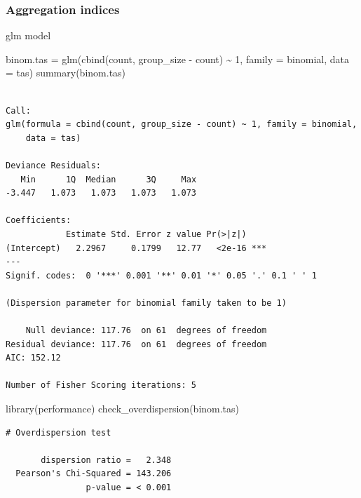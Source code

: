 \documentclass[
  letterpaper,
  DIV=11,
  numbers=noendperiod]{scrreprt}
\newenvironment{Shaded}{\begin{snugshade}}{\end{snugshade}}
\newcommand{\AttributeTok}[1]{\textcolor[rgb]{0.40,0.45,0.13}{#1}}
\newcommand{\DecValTok}[1]{\textcolor[rgb]{0.68,0.00,0.00}{#1}}
\newcommand{\FunctionTok}[1]{\textcolor[rgb]{0.28,0.35,0.67}{#1}}
\newcommand{\NormalTok}[1]{\textcolor[rgb]{0.00,0.23,0.31}{#1}}
\newcommand{\OtherTok}[1]{\textcolor[rgb]{0.00,0.23,0.31}{#1}}
\newcommand{\SpecialCharTok}[1]{\textcolor[rgb]{0.37,0.37,0.37}{#1}}
\begin{document}
\hypertarget{aggregation-indices-1}{%
\subsubsection{Aggregation indices}\label{aggregation-indices-1}}

glm model

\begin{Shaded}
\begin{Highlighting}[]
\NormalTok{binom.tas }\OtherTok{=} \FunctionTok{glm}\NormalTok{(}\FunctionTok{cbind}\NormalTok{(count, group\_size }\SpecialCharTok{{-}}\NormalTok{ count) }\SpecialCharTok{\textasciitilde{}} \DecValTok{1}\NormalTok{,}
                \AttributeTok{family =}\NormalTok{ binomial,}
                \AttributeTok{data =}\NormalTok{ tas)}
\FunctionTok{summary}\NormalTok{(binom.tas)}
\end{Highlighting}
\end{Shaded}

\begin{verbatim}

Call:
glm(formula = cbind(count, group_size - count) ~ 1, family = binomial, 
    data = tas)

Deviance Residuals: 
   Min      1Q  Median      3Q     Max  
-3.447   1.073   1.073   1.073   1.073  

Coefficients:
            Estimate Std. Error z value Pr(>|z|)    
(Intercept)   2.2967     0.1799   12.77   <2e-16 ***
---
Signif. codes:  0 '***' 0.001 '**' 0.01 '*' 0.05 '.' 0.1 ' ' 1

(Dispersion parameter for binomial family taken to be 1)

    Null deviance: 117.76  on 61  degrees of freedom
Residual deviance: 117.76  on 61  degrees of freedom
AIC: 152.12

Number of Fisher Scoring iterations: 5
\end{verbatim}

\begin{Shaded}
\begin{Highlighting}[]
\FunctionTok{library}\NormalTok{(performance)}
\FunctionTok{check\_overdispersion}\NormalTok{(binom.tas)}
\end{Highlighting}
\end{Shaded}

\begin{verbatim}
# Overdispersion test

       dispersion ratio =   2.348
  Pearson's Chi-Squared = 143.206
                p-value = < 0.001
\end{verbatim}
\end{document}
